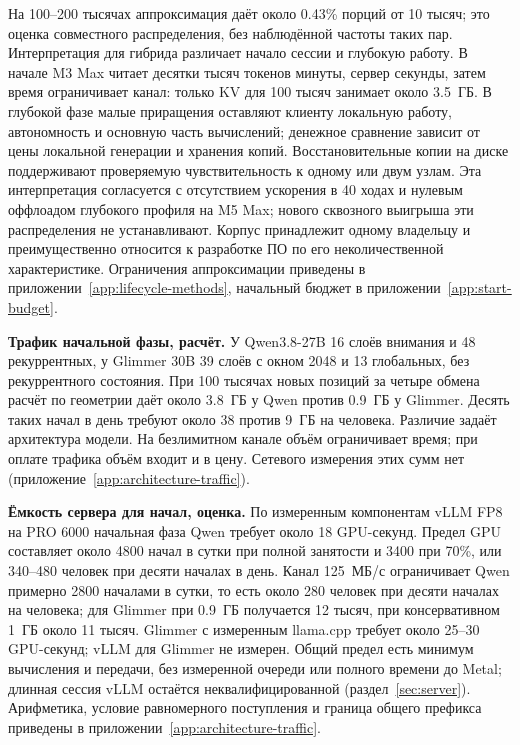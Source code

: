 На 100--200 тысячах аппроксимация даёт около 0.43\% порций от 10 тысяч;
это оценка совместного распределения, без наблюдённой частоты таких пар.
Интерпретация для гибрида различает начало сессии и глубокую работу.
В начале M3 Max читает десятки тысяч токенов минуты, сервер секунды, затем время ограничивает канал:
только KV для 100 тысяч занимает около 3.5~ГБ.
В глубокой фазе малые приращения оставляют клиенту локальную работу, автономность и основную часть вычислений;
денежное сравнение зависит от цены локальной генерации и хранения копий.
Восстановительные копии на диске поддерживают проверяемую чувствительность к одному или двум узлам.
Эта интерпретация согласуется с отсутствием ускорения в 40 ходах и нулевым оффлоадом глубокого профиля на M5 Max;
нового сквозного выигрыша эти распределения не устанавливают.
Корпус принадлежит одному владельцу и преимущественно относится к разработке ПО по его неколичественной характеристике.
Ограничения аппроксимации приведены в приложении~\ref{app:lifecycle-methods},
начальный бюджет в приложении~\ref{app:start-budget}.


\textbf{Трафик начальной фазы, расчёт.} У Qwen3.8-27B 16 слоёв внимания и 48 рекуррентных,
у Glimmer 30B 39 слоёв с окном 2048 и 13 глобальных, без рекуррентного состояния.
При 100 тысячах новых позиций за четыре обмена расчёт по геометрии даёт около 3.8~ГБ у Qwen
против 0.9~ГБ у Glimmer. Десять таких начал в день требуют около 38 против 9~ГБ на человека.
Различие задаёт архитектура модели. На безлимитном канале объём ограничивает время;
при оплате трафика объём входит и в цену. Сетевого измерения этих сумм нет
(приложение~\ref{app:architecture-traffic}).

\textbf{Ёмкость сервера для начал, оценка.} По измеренным компонентам vLLM FP8 на PRO 6000
начальная фаза Qwen требует около 18 GPU-секунд. Предел GPU составляет около 4800 начал в сутки
при полной занятости и 3400 при 70\%, или 340--480 человек при десяти началах в день.
Канал 125~МБ/с ограничивает Qwen примерно 2800 началами в сутки, то есть около 280 человек
при десяти началах на человека;
для Glimmer при 0.9~ГБ получается 12 тысяч, при консервативном 1~ГБ около 11 тысяч.
Glimmer с измеренным llama.cpp требует около 25--30 GPU-секунд; vLLM для Glimmer не измерен.
Общий предел есть минимум вычисления и передачи, без измеренной очереди или полного времени до Metal;
длинная сессия vLLM остаётся неквалифицированной (раздел~\ref{sec:server}).
Арифметика, условие равномерного поступления и граница общего префикса приведены в приложении~\ref{app:architecture-traffic}.
